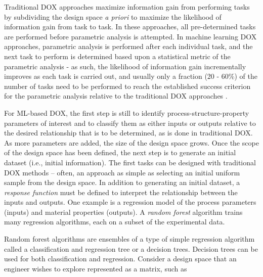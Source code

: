 Traditional DOX approaches maximize information gain from performing tasks by subdividing the design space \textit{a priori} to maximize the likelihood of information gain from task to task. In these approaches, all pre-determined tasks are performed before parametric analysis is attempted. In machine learning DOX approaches, parametric analysis is performed after each individual task, and the next task to perform is determined based upon a statistical metric of the parametric analysis - as such, the likelihood of information gain incrementally improves as each task is carried out, and usually only a fraction (20 - 60\%) of the number of tasks need to be performed to reach the established success criterion for the parametric analysis relative to the traditional DOX approaches \cite{Wigley2016, Ling2017a}.

For ML-based DOX, the first step is still to identify process-structure-property parameters of interest and to classify them as either inputs or outputs relative to the desired relationship that is to be determined, as is done in traditional DOX. As more parameters are added, the size of the design space grows. Once the scope of the design space has been defined, the next step is to generate an initial dataset (i.e., initial information). The first tasks can be designed with traditional DOX methods -- often, an approach as simple as selecting an initial uniform sample from the design space. In addition to generating an initial dataset, a \textit{response function} must be defined to interpret the relationship between the inputs and outputs. One example is a regression model of the process parameters (inputs) and material properties (outputs). A \textit{random forest} algorithm trains many regression algorithms, each on a subset of the experimental data. 

Random forest algorithms are ensembles of a type of simple regression algorithm called a classification and regression tree or a decision trees. Decision trees can be used for both classification and regression. Consider a design space that an engineer wishes to explore represented as a matrix, such as \newline

